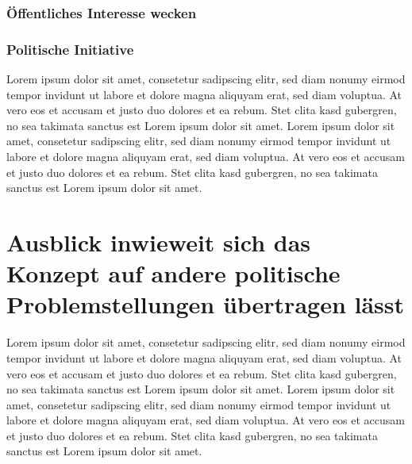 \documentclass[a4paper, 10pt]{scrartcl}
\begin{document}
\subsubsection{Öffentliches Interesse wecken}
\subsubsection{Politische Initiative}

Lorem ipsum dolor sit amet, consetetur sadipscing elitr, sed diam nonumy eirmod tempor invidunt ut labore et dolore magna aliquyam erat, sed diam voluptua. At vero eos et accusam et justo duo dolores et ea rebum. Stet clita kasd gubergren, no sea takimata sanctus est Lorem ipsum dolor sit amet. Lorem ipsum dolor sit amet, consetetur sadipscing elitr, sed diam nonumy eirmod tempor invidunt ut labore et dolore magna aliquyam erat, sed diam voluptua. At vero eos et accusam et justo duo dolores et ea rebum. Stet clita kasd gubergren, no sea takimata sanctus est Lorem ipsum dolor sit amet.
\section{Ausblick inwieweit sich das Konzept auf andere politische Problemstellungen übertragen lässt}
Lorem ipsum dolor sit amet, consetetur sadipscing elitr, sed diam nonumy eirmod tempor invidunt ut labore et dolore magna aliquyam erat, sed diam voluptua. At vero eos et accusam et justo duo dolores et ea rebum. Stet clita kasd gubergren, no sea takimata sanctus est Lorem ipsum dolor sit amet. Lorem ipsum dolor sit amet, consetetur sadipscing elitr, sed diam nonumy eirmod tempor invidunt ut labore et dolore magna aliquyam erat, sed diam voluptua. At vero eos et accusam et justo duo dolores et ea rebum. Stet clita kasd gubergren, no sea takimata sanctus est Lorem ipsum dolor sit amet.


\cite{bitzer1999digitale}
\cite{clark2016financial}
\cite{panko2014business}
\cite{antonopoulos2014mastering}
\cite{DannenChris2017IEaS}
\cite{GrosjeanGodefroy2017RtEU}
\cite{tietenberg2006emissions}
\cite{gerhard2000theorie}
\cite{Dutschke1998Issues}


\nocite{bitzer1999digitale}
\nocite{clark2016financial}
\nocite{panko2014business}
\nocite{antonopoulos2014mastering}
\nocite{DannenChris2017IEaS}
\nocite{GrosjeanGodefroy2017RtEU}
\nocite{tietenberg2006emissions}
\nocite{gerhard2000theorie}
\nocite{Dutschke1998Issues}
\nocite{economics2017state}

\newpage
\listoffigures %

\newpage
\end{document}
